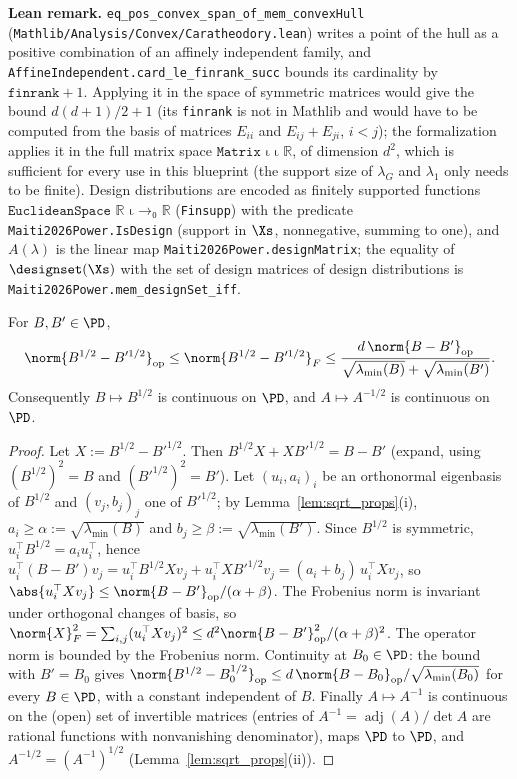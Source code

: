 \textbf{Lean remark.} \texttt{eq\_pos\_convex\_span\_of\_mem\_convexHull}
(\texttt{Mathlib/Analysis/Convex/Caratheodory.lean}) writes a point of the hull as a positive
combination of an affinely independent family, and
\texttt{AffineIndependent.card\_le\_finrank\_succ} bounds its cardinality by
$\texttt{finrank} + 1$. Applying it in the space of symmetric matrices would give the bound
$d(d+1)/2 + 1$ (its \texttt{finrank} is not in Mathlib and would have to be computed from the
basis of matrices $E_{ii}$ and $E_{ij} + E_{ji}$, $i < j$); the formalization applies it in the
full matrix space $\texttt{Matrix ι ι ℝ}$, of dimension $d^2$, which is sufficient for every use
in this blueprint (the support size of $\lambda_G$ and $\lambda_1$ only needs to be finite).
Design distributions are encoded as finitely supported functions
$\texttt{EuclideanSpace ℝ ι →₀ ℝ}$ (\texttt{Finsupp}) with the predicate \texttt{Maiti2026Power.IsDesign}
(support in $\Xs$, nonnegative, summing to one), and $A(\lambda)$ is the linear map
\texttt{Maiti2026Power.designMatrix}; the equality of $\designset(\Xs)$ with the set of design matrices
of design distributions is \texttt{Maiti2026Power.mem\_designSet\_iff}.

\begin{lemma}\label{lem:design_sqrt_continuous}
For $B, B' \in \PD$,
\[
  \norm{B^{1/2} - B'^{1/2}}_{\mathrm{op}} \le \norm{B^{1/2} - B'^{1/2}}_F \le
  \frac{d\,\norm{B - B'}_{\mathrm{op}}}{\sqrt{\lambda_{\min}(B)} + \sqrt{\lambda_{\min}(B')}} .
\]
Consequently $B \mapsto B^{1/2}$ is continuous on $\PD$, and $A \mapsto A^{-1/2}$ is continuous
on $\PD$.
\end{lemma}

\begin{proof}
Let $X := B^{1/2} - B'^{1/2}$. Then $B^{1/2}X + XB'^{1/2} = B - B'$ (expand, using
$(B^{1/2})^2 = B$ and $(B'^{1/2})^2 = B'$). Let $(u_i, a_i)_i$ be an orthonormal eigenbasis of
$B^{1/2}$ and $(v_j, b_j)_j$ one of $B'^{1/2}$; by Lemma~\ref{lem:sqrt_props}(i),
$a_i \ge \alpha := \sqrt{\lambda_{\min}(B)}$ and $b_j \ge \beta := \sqrt{\lambda_{\min}(B')}$.
Since $B^{1/2}$ is symmetric, $u_i^\top B^{1/2} = a_iu_i^\top$, hence
$u_i^\top(B - B')v_j = u_i^\top B^{1/2}Xv_j + u_i^\top XB'^{1/2}v_j = (a_i + b_j)\,u_i^\top Xv_j$, so
$\abs{u_i^\top X v_j} \le \norm{B - B'}_{\mathrm{op}}/(\alpha + \beta)$. The Frobenius norm is
invariant under orthogonal changes of basis, so $\norm{X}_F^2 = \sum_{i,j}(u_i^\top Xv_j)^2 \le
d^2\norm{B-B'}_{\mathrm{op}}^2/(\alpha+\beta)^2$. The operator norm is bounded by the Frobenius
norm. Continuity at $B_0 \in \PD$: the bound with $B' = B_0$ gives
$\norm{B^{1/2} - B_0^{1/2}}_{\mathrm{op}} \le d\,\norm{B - B_0}_{\mathrm{op}}/\sqrt{\lambda_{\min}(B_0)}$
for every $B \in \PD$, with a constant independent of $B$. Finally $A \mapsto A^{-1}$ is
continuous on the (open) set of invertible matrices (entries of $A^{-1} = \operatorname{adj}(A)/\det A$
are rational functions with nonvanishing denominator), maps $\PD$ to $\PD$, and
$A^{-1/2} = (A^{-1})^{1/2}$ (Lemma~\ref{lem:sqrt_props}(ii)).
\end{proof}

